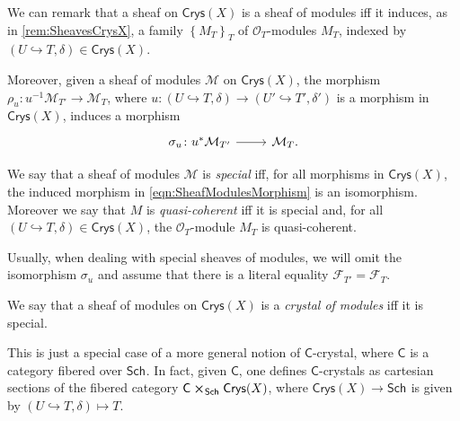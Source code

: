 \begin{rem}[]
	We can remark that a sheaf on $\mathsf{Crys}(X)$ is a sheaf of modules
	iff it induces, as in \cref{rem:SheavesCrysX}, a
	family $\left\{ M_T \right\}_{T}$ of $\mathcal{O}_{ T }$-modules $M_T$, 
	indexed by $\left(U \hookrightarrow T, \delta\right) \in \mathsf{Crys}(X)$.

	Moreover, given a sheaf of modules $\mathcal{M}$ on $\mathsf{Crys}(X)$,
	the morphism $\rho_u\colon u^{-1}\mathcal{M}_{T'} \to \mathcal{M}_T$,
	where $u\colon \left(U \hookrightarrow T, \delta\right) \to
	\left(U' \hookrightarrow T', \delta'\right)$
	is a morphism in $\mathsf{Crys}(X)$, induces a morphism
	\begin{equation}\label{eqn:SheafModulesMorphism}
	\begin{tikzcd}[row sep = 0ex
		,/tikz/column 1/.append style={anchor=base east}
		,/tikz/column 2/.append style={anchor=base west}]
		\sigma_u\colon 
		u^* \mathcal{M}_{T'}\arrow[r, "", rightarrow] &
		\mathcal{M}_T
	.\end{tikzcd}
	\end{equation} 	
\end{rem}


\begin{defn}[]\label{defn:SpecialQCSheavesCrys}
	We say that a sheaf of modules $\mathcal{M}$ is {\em special}
	iff, for all morphisms in $\mathsf{Crys}(X)$,
	the induced morphism in \cref{eqn:SheafModulesMorphism}
	is an isomorphism.
	Moreover we say that $M$ is {\em quasi-coherent} iff it is special and, for all
	$\left(U \hookrightarrow T, \delta\right) \in \mathsf{Crys}(X)$, the $\mathcal{O}_{ T }$-module
	$M_T$ is quasi-coherent.
\end{defn}


\begin{rem}[]\label{rem:specialSheavesIso}
	Usually, when dealing with special sheaves of modules, we will omit the isomorphism
	$\sigma_u$ and assume that there is a literal equality
	$\mathcal{F}_{T'} = \mathcal{F}_T$.
\end{rem}


\begin{defn}
	We say that a sheaf of modules on $\mathsf{Crys}(X)$ is 
	a {\em crystal of modules} iff it is special.
\end{defn}


\begin{rem}[]
	This is just a special case of a more general notion 
	of $\mathsf{C}$-crystal, where $\mathsf{C}$ is a category fibered over $\mathsf{Sch}_{  }$.
	In fact, given $\mathsf{C}$, one defines $\mathsf{C}$-crystals as cartesian
	sections of the fibered category $\mathsf{C} \cross_{ \mathsf{Sch}_{  } } \mathsf{Crys}(X)$,
	where $\mathsf{Crys}(X) \to \mathsf{Sch}_{  }$ is given by
	$\left(U \hookrightarrow T, \delta\right) \mapsto T$.
\end{rem}


